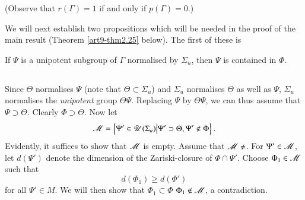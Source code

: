 (Observe that $r (\Gamma) = 1$ if and only if $p(\Gamma) = 0$.)

We will next establish two propositions which will be needed in the proof of the main result (Theorem \ref{art9-thm2.25} below). The first of these is 

\begin{proposition}\label{art9-prop2.21}
If $\Psi$ is a unipotent subgroup of $\Gamma$ normalised by $\Sigma_u$, then $\Psi$ is contained in $\Phi$.
\end{proposition}

\setcounter{subsection}{21}
\subsection{}\label{art9-subsec2.22}
Since $\Theta$ normalises $\Psi$ (note that $\Theta \subset \Sigma_u$) and $\Sigma_u$ normalises $\Theta$ as well as $\Psi$, $\Sigma_u$ normalises the \textit{unipotent} group $\Theta \Psi$. Replacing $\Psi$ by $\Theta \Psi$, we can thus assume that $\Psi \supset \Theta$. Clearly $\Phi \supset \Theta$. Now let 
$$
\mathscr{M} = \left\{\Psi' \in \mathscr{U} (\Sigma_u) \big| \Psi' \supset \Theta, \Psi' \not\in \Phi  \right\}.
$$
Evidently, it suffices to show that $\mathscr{M}$ is empty. Assume that $\sM \neq \empty$. For $\Psi' \in \mathscr{M}$, let $d(\Psi')$ denote the dimension of the Zariski-closure of $\Phi \cap \Psi'$. Choose $\Phi_1 \in \mathscr{M}$ such that 
$$
d (\Phi_1) \geqslant d (\Phi')
$$
for all $\Psi' \in M$. We will then show that $\Phi_1 \subset \Phi$ \ie $\Phi_1 \not\in \mathscr{M}$, a contradiction.

